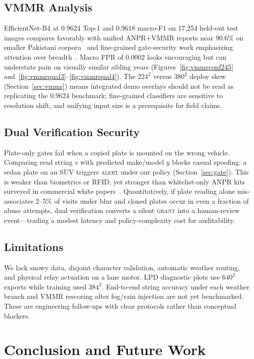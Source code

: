\documentclass[10pt, conference]{IEEEtran}
\begin{document}
\subsection{VMMR Analysis}
EfficientNet-B4 at 0.9624 Top-1 and 0.9618 macro-F1 on 17{,}254 held-out test images compares favorably with unified ANPR+VMMR reports near 90.6\% on smaller Pakistani corpora~\cite{r03} and fine-grained gate-security work emphasizing attention over breadth~\cite{r08}. Macro FPR of 0.0002 looks encouraging but can understate pain on visually similar sibling years (Figures~\ref{fig:vmmrconf245} and~\ref{fig:vmmrqual3}--\ref{fig:vmmrqual4}). The $224^2$ versus $380^2$ deploy skew (Section~\ref{sec:vmmr}) means integrated demo overlays should not be read as replicating the 0.9624 benchmark; fine-grained classifiers are sensitive to resolution shift, and unifying input size is a prerequisite for field claims.

\subsection{Dual Verification Security}
Plate-only gates fail when a copied plate is mounted on the wrong vehicle. Comparing read string $s$ with predicted make/model $y$ blocks casual spoofing: a sedan plate on an SUV triggers \textsc{alert} under our policy (Section~\ref{sec:gate}). This is weaker than biometrics or RFID, yet stronger than whitelist-only ANPR kits surveyed in commercial white papers~\cite{r09,r29}. Quantitatively, if plate reading alone mis-associates 2--5\% of visits under blur and cloned plates occur in even a fraction of abuse attempts, dual verification converts a silent \textsc{grant} into a human-review event---trading a modest latency and policy-complexity cost for auditability.

\subsection{Limitations}
We lack snowy data, disjoint character validation, automatic weather routing, and physical relay actuation on a lane motor. LPD diagnostic plots use $640^2$ exports while training used $384^2$. End-to-end string accuracy under each weather branch and VMMR rescoring after fog/rain injection are not yet benchmarked. These are engineering follow-ups with clear protocols rather than conceptual blockers.


\section{Conclusion and Future Work}
\label{sec:conc}
\end{document}

